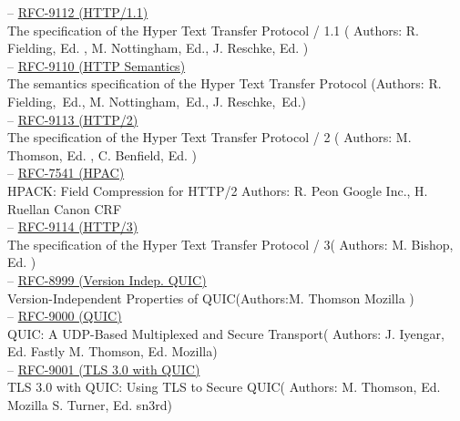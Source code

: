 \documentclass[10pt,a4paper,english]{article}
\begin{document}
\begin{multicols}{2}
\begin{flushleft}
\end{flushleft}
\begin{flushleft}
\hspace*{1em}-- \href{https://www.rfc-editor.org/rfc/rfc9112.pdf}{RFC-9112 (HTTP/1.1)}\\The specification of the Hyper Text Transfer Protocol / 1.1 ( Authors: R. Fielding, Ed. , M. Nottingham, Ed.,  J. Reschke, Ed. ) \\
\hspace*{1em}-- \href{https://www.rfc-editor.org/rfc/rfc9110.pdf}{RFC-9110 (HTTP Semantics)} \\The semantics specification of the Hyper Text Transfer Protocol (Authors: R. Fielding, Ed., M. Nottingham, Ed., J. Reschke, Ed.)\\
\hspace*{1em}-- \href{https://www.rfc-editor.org/rfc/rfc9113.pdf}{RFC-9113 (HTTP/2)} \\The specification of the Hyper Text Transfer Protocol / 2 ( Authors:             M. Thomson, Ed. , C. Benfield, Ed. )\\
\hspace*{1em}-- \href{https://www.rfc-editor.org/rfc/pdfrfc/rfc7541.txt.pdf}{RFC-7541 (HPAC)} \\HPACK: Field Compression for HTTP/2 Authors:  R. Peon Google Inc., H. Ruellan Canon CRF\\
\hspace*{1em}-- \href{https://www.rfc-editor.org/rfc/rfc9114.pdf}{RFC-9114 (HTTP/3)} \\The specification of the Hyper Text Transfer Protocol / 3( Authors: M. Bishop, Ed. ) \\
\hspace*{1em}-- \href{https://www.rfc-editor.org/rfc/rfc8999.pdf}{RFC-8999 (Version Indep. QUIC)} \\Version-Independent Properties of QUIC(Authors:M. Thomson Mozilla ) \\
\hspace*{1em}-- \href{https://www.rfc-editor.org/rfc/rfc9000.pdf}{RFC-9000 (QUIC)} \\QUIC: A UDP-Based Multiplexed and Secure Transport( Authors: J. Iyengar, Ed. Fastly
M. Thomson, Ed. Mozilla) \\
\hspace*{1em}-- \href{https://www.rfc-editor.org/rfc/rfc9001.pdf}{RFC-9001 (TLS 3.0 with QUIC)} \\TLS 3.0 with QUIC: Using TLS to Secure QUIC( Authors: M. Thomson, Ed. Mozilla
S. Turner, Ed. sn3rd) \\

\end{flushleft}
\end{multicols}
\end{document}
